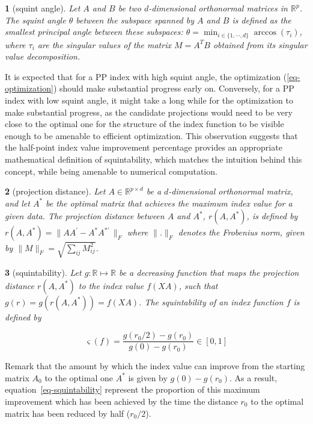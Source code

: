 \documentclass[
  12pt,
]{interact}
\theoremstyle{plain}
\newtheorem{defn}{\protect\definitionname}
\providecommand{\definitionname}{Definition}
\begin{document}
\begin{defn}[squint angle]\label{def:squint-angle}
Let $A$ and $B$ be two $d$-dimensional orthonormal matrices in $\mathbb{R}^p$. The squint angle $\theta$ between the subspace spanned by $A$ and $B$ is defined as the smallest principal angle between these subspaces: $\theta = \min_{i \in \{1, \cdots, d\}} \arccos(\tau_i)$, where $\tau_i$ are the singular values of the matrix $M = A^T B$ obtained from its singular value decomposition.
\end{defn}

It is expected that for a PP index with high squint angle, the
optimization (\eqref{eq-optimization}) should make substantial progress
early on. Conversely, for a PP index with low squint angle, it might
take a long while for the optimization to make substantial progress, as
the candidate projections would need to be very close to the optimal one
for the structure of the index function to be visible enough to be
amenable to efficient optimization. This observation suggests that the
half-point index value improvement percentage provides an appropriate
mathematical definition of squintability, which matches the intuition
behind this concept, while being amenable to numerical computation.

\begin{defn}[projection distance]\label{def:proj-dist}
Let $A \in \mathbb{R}^{p \times d}$ be a $d$-dimensional orthonormal matrix, and let $A^*$ be the optimal matrix that achieves the maximum index value for a given data. The projection distance between $A$ 
and $A^*$, $r(A, A^*)$, is defined by
$r(A, A^*) = \lVert AA^\prime - A^*A^{*\prime}\,\rVert _F$
where $\lVert . \rVert _F$ denotes the Frobenius norm, given by
$\lVert M \rVert _F = \sqrt{\sum_{ij} M_{ij}^2}$. 
\end{defn}
\begin{defn}[squintability]\label{def:squintability}
Let $g: \mathbb{R} \mapsto  \mathbb{R}$ be a decreasing function that maps the projection distance $r(A, A^*)$ to the index value $f(XA)$, such that $g(r) = g(r(A, A^*)) = f(XA)$.  The squintability of an index function $f$ is defined by 

\begin{equation}
\varsigma(f) = \frac{g(r_{0}/2)-g(r_{0})}{g(0)-g(r_{0})} \in [0,1]
\label{eq-squintability}
\end{equation}

\end{defn}

Remark that the amount by which the index value can improve from the
starting matrix \(A_0\) to the optimal one \(A^*\) is given by
\(g(0)-g(r_{0})\). As a result, equation~\eqref{eq-squintability}
represent the proportion of this maximum improvement which has been
achieved by the time the distance \(r_0\) to the optimal matrix has been
reduced by half (\(r_0/2\)).
\end{document}
